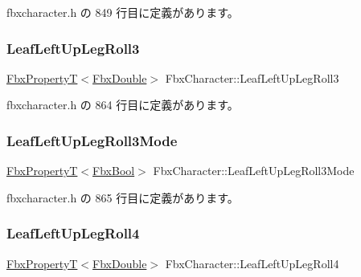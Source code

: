  fbxcharacter.\+h の 849 行目に定義があります。

\mbox{\label{class_fbx_character_abebd72ca2e28adad945143805f05b56b}} 
\subsubsection{\texorpdfstring{Leaf\+Left\+Up\+Leg\+Roll3}{LeafLeftUpLegRoll3}}
{\footnotesize\ttfamily \hyperlink{class_fbx_property_t}{Fbx\+PropertyT}$<$\hyperlink{fbxtypes_8h_a171e72a1c46fc15c1a6c9c31948c1c5b}{Fbx\+Double}$>$ Fbx\+Character\+::\+Leaf\+Left\+Up\+Leg\+Roll3}



 fbxcharacter.\+h の 864 行目に定義があります。

\mbox{\label{class_fbx_character_a21b83a15b1e9251f7c0dd8cf7b05f10f}} 
\subsubsection{\texorpdfstring{Leaf\+Left\+Up\+Leg\+Roll3\+Mode}{LeafLeftUpLegRoll3Mode}}
{\footnotesize\ttfamily \hyperlink{class_fbx_property_t}{Fbx\+PropertyT}$<$\hyperlink{fbxtypes_8h_a92e0562b2fe33e76a242f498b362262e}{Fbx\+Bool}$>$ Fbx\+Character\+::\+Leaf\+Left\+Up\+Leg\+Roll3\+Mode}



 fbxcharacter.\+h の 865 行目に定義があります。

\mbox{\label{class_fbx_character_aa36e9ed571d7761086ba36df943b2d88}} 
\subsubsection{\texorpdfstring{Leaf\+Left\+Up\+Leg\+Roll4}{LeafLeftUpLegRoll4}}
{\footnotesize\ttfamily \hyperlink{class_fbx_property_t}{Fbx\+PropertyT}$<$\hyperlink{fbxtypes_8h_a171e72a1c46fc15c1a6c9c31948c1c5b}{Fbx\+Double}$>$ Fbx\+Character\+::\+Leaf\+Left\+Up\+Leg\+Roll4}



